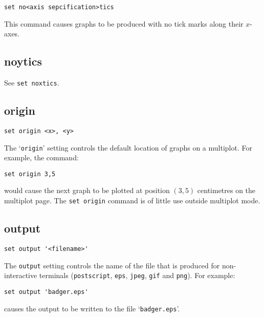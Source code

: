 \documentclass[a4paper,onecolumn,11pt]{book}
\begin{document}
\begin{verbatim}
set no<axis sepcification>tics
\end{verbatim}

This command causes graphs to be produced with no tick marks along their $x$-axes.

\subsection{noytics}

See {\tt set noxtics}.


\subsection{origin}

\begin{verbatim}
set origin <x>, <y>
\end{verbatim}

The `{\tt origin}' setting controls the default location of graphs on a multiplot.
For example, the command:

\begin{verbatim}
set origin 3,5
\end{verbatim}

\noindent would cause the next graph to be plotted at position $(3,5)$ centimetres on the
multiplot page. The {\tt set origin} command is of little use outside multiplot
mode.


\subsection{output}

\begin{verbatim}
set output '<filename>'
\end{verbatim}

The {\tt output} setting controls the name of the file that is produced for
non-interactive terminals ({\tt postscript}, {\tt eps}, {\tt jpeg}, {\tt gif}
and {\tt png}).  For example:

\begin{verbatim}
set output 'badger.eps'
\end{verbatim}

\noindent causes the output to be written to the file `{\tt badger.eps}'.
\end{document}
